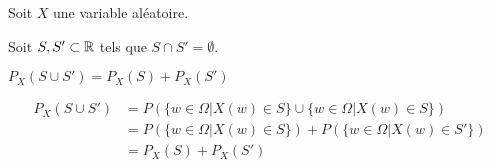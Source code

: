 \documentclass[a4paper, 12pt]{article}
\begin{document}
\begin{proposition}
    Soit $X$ une variable aléatoire.

    Soit $S, S' \subset \mathbb{R}$ tels que $S \cap S' = \emptyset$.

    $P_X(S \cup S') = P_X(S) + P_X(S')$
\end{proposition}

\begin{demonstration}
    \begin{align*}
        P_X(S \cup S') &= P(\{w \in \Omega | X(w) \in S\} \cup\{w \in \Omega | X(w) \in S\}) \\
        &= P(\{w \in \Omega | X(w) \in S\}) + P(\{w \in \Omega | X(w) \in S'\}) \\
        &= P_X(S) + P_X(S')
    \end{align*}
\end{demonstration}
\end{document}
